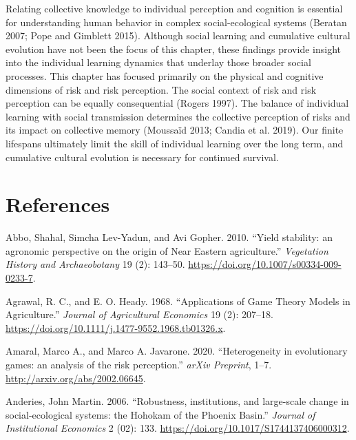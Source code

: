 \documentclass[smallextended]{svjour3}       %
\begin{document}
Relating collective knowledge to individual perception and cognition is essential for understanding human behavior in complex social-ecological systems (Beratan 2007; Pope and Gimblett 2015). Although social learning and cumulative cultural evolution have not been the focus of this chapter, these findings provide insight into the individual learning dynamics that underlay those broader social processes. This chapter has focused primarily on the physical and cognitive dimensions of risk and risk perception. The social context of risk and risk perception can be equally consequential (Rogers 1997). The balance of individual learning with social transmission determines the collective perception of risks and its impact on collective memory (Moussaïd 2013; Candia et al. 2019). Our finite lifespans ultimately limit the skill of individual learning over the long term, and cumulative cultural evolution is necessary for continued survival.

\setlength{\parindent}{-0.5in}
\setlength{\leftskip}{0.5in}
\setlength{\parskip}{8pt}

\hypertarget{references}{%
\section{References}\label{references}}

\noindent

\hypertarget{refs}{}
\leavevmode\hypertarget{ref-Abbo2010}{}%
Abbo, Shahal, Simcha Lev-Yadun, and Avi Gopher. 2010. ``Yield stability: an agronomic perspective on the origin of Near Eastern agriculture.'' \emph{Vegetation History and Archaeobotany} 19 (2): 143--50. \url{https://doi.org/10.1007/s00334-009-0233-7}.

\leavevmode\hypertarget{ref-Agrawal1968}{}%
Agrawal, R. C., and E. O. Heady. 1968. ``Applications of Game Theory Models in Agriculture.'' \emph{Journal of Agricultural Economics} 19 (2): 207--18. \url{https://doi.org/10.1111/j.1477-9552.1968.tb01326.x}.

\leavevmode\hypertarget{ref-Amaral2020}{}%
Amaral, Marco A., and Marco A. Javarone. 2020. ``Heterogeneity in evolutionary games: an analysis of the risk perception.'' \emph{arXiv Preprint}, 1--7. \url{http://arxiv.org/abs/2002.06645}.

\leavevmode\hypertarget{ref-Anderies2006}{}%
Anderies, John Martin. 2006. ``Robustness, institutions, and large-scale change in social-ecological systems: the Hohokam of the Phoenix Basin.'' \emph{Journal of Institutional Economics} 2 (02): 133. \url{https://doi.org/10.1017/S1744137406000312}.
\end{document}
